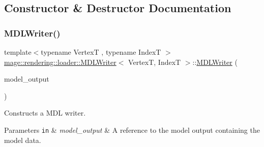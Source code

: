 \subsection{Constructor \& Destructor Documentation}
\hypertarget{classmage_1_1rendering_1_1loader_1_1_m_d_l_writer_a6b30e49f08b5c6cd4702f5fdecd17561}{}\label{classmage_1_1rendering_1_1loader_1_1_m_d_l_writer_a6b30e49f08b5c6cd4702f5fdecd17561} 
\subsubsection{\texorpdfstring{M\+D\+L\+Writer()}{MDLWriter()}\hspace{0.1cm}{\footnotesize\ttfamily [1/3]}}
{\footnotesize\ttfamily template$<$typename VertexT , typename IndexT $>$ \\
\hyperlink{classmage_1_1rendering_1_1loader_1_1_m_d_l_writer}{mage\+::rendering\+::loader\+::\+M\+D\+L\+Writer}$<$ VertexT, IndexT $>$\+::\hyperlink{classmage_1_1rendering_1_1loader_1_1_m_d_l_writer}{M\+D\+L\+Writer} (\begin{DoxyParamCaption}\item[{const \hyperlink{structmage_1_1rendering_1_1_model_output}{Model\+Output}$<$ VertexT, IndexT $>$ \&}]{model\+\_\+output }\end{DoxyParamCaption})\hspace{0.3cm}{\ttfamily [explicit]}}

Constructs a M\+DL writer.


\begin{DoxyParams}[1]{Parameters}
\mbox{\tt in}  & {\em model\+\_\+output} & A reference to the model output containing the model data. \\
\hline
\end{DoxyParams}
\hypertarget{classmage_1_1rendering_1_1loader_1_1_m_d_l_writer_a475ff3efdba707303052bae28d3ba85b}{}\label{classmage_1_1rendering_1_1loader_1_1_m_d_l_writer_a475ff3efdba707303052bae28d3ba85b} 
